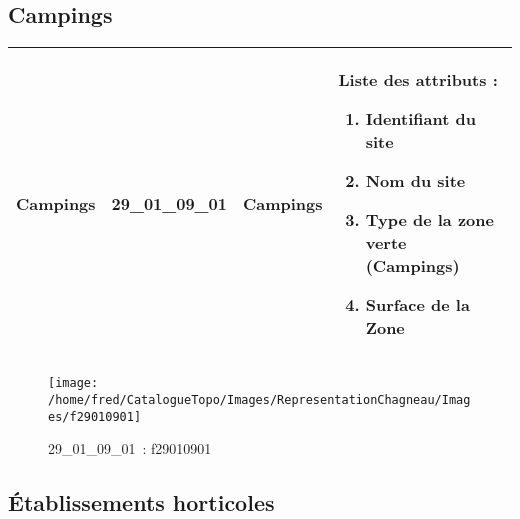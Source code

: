 \documentclass[12pt,titlepage]{book}
\begin{document}
\subsection{Campings}
\noindent
\vspace{\baselineskip}

\renewcommand{\arraystretch}{1.2}
\begin{supertabular}{|p{10cm}|c|p{13cm}|p{12cm}|}
 Campings & 29\_01\_09\_01 & Campings & Liste des attributs :
\begin{enumerate}
  \item Identifiant du site  \item Nom du site  \item Type de la zone verte (Campings)  \item Surface de la Zone\end{enumerate}
\\
\hline
\end{supertabular}
\begin{figure}[h!]
  \hfill         %
  \begin{minipage}[t]{3cm}
    \begin{center}
      \texttt{[image: /home/fred/CatalogueTopo/Images/RepresentationChagneau/Images/f29010901]}
      \caption[~29\_01\_09\_01]{\small{29\_01\_09\_01~:} \tiny{f29010901}}\label{f29010901}
    \end{center}
  \end{minipage}
\end{figure}


\subsection{Établissements horticoles}
\noindent
\vspace{\baselineskip}
\end{document}
